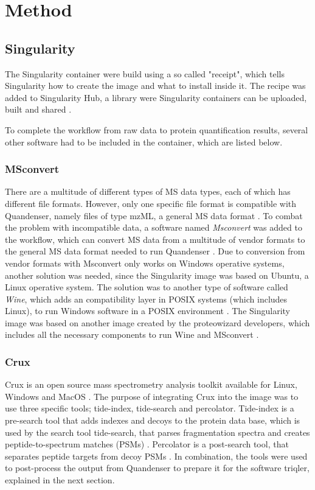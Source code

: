 \section{Method}

\subsection{Singularity}
The Singularity container were build using a so called "receipt", which tells Singularity how to create the image and what to install inside it. The recipe was added to Singularity Hub, a library were Singularity containers can be uploaded, built and shared \cite{singularity-hub}.

To complete the workflow from raw data to protein quantification results, several other software had to be included in the container, which are listed below.

\subsubsection{MSconvert}
There are a multitude of different types of MS data types, each of which has different file formats. However, only one specific file format is compatible with Quandenser, namely files of type mzML, a general MS data format \cite{mzml-format}. To combat the problem with incompatible data, a software named \textit{Msconvert} was added to the workflow, which can convert MS data from a multitude of vendor formats to the general MS data format needed to run Quandenser \cite{proteowizard}. Due to conversion from vendor formats with Msconvert only works on Windows operative systems, another solution was needed, since the Singularity image was based on Ubuntu, a Linux operative system. The solution was to another type of software called \textit{Wine}, which adds an compatibility layer in POSIX systems (which includes Linux), to run Windows software in a POSIX environment \cite{wine}. The Singularity image was based on another image created by the proteowizard developers, which includes all the necessary components to run Wine and MSconvert \cite{docker-image} \cite{docker-howto}.

\subsubsection{Crux}
Crux is an open source mass spectrometry analysis toolkit available for Linux, Windows and MacOS \cite{crux}. The purpose of integrating Crux into the image was to use three specific tools; tide-index, tide-search and percolator. Tide-index is a pre-search tool that adds indexes and decoys to the protein data base, which is used by the search tool tide-search, that parses fragmentation spectra and creates peptide-to-spectrum matches (PSMs) \cite{tide-search}. Percolator is a post-search tool, that separates peptide targets from decoy PSMs \cite{percolator}. In combination, the tools were used to post-process the output from Quandenser to prepare it for the software triqler, explained in the next section.

